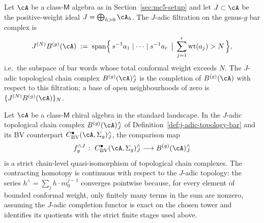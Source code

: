 \begin{definition}
\label{def:j-adic-topology-bar}
%
Let $\cA$ be a class-$\mathsf{M}$ algebra as in
Section~\textup{\ref{sec:mc5-setup}} and let $J \subset \cA$ be the
positive-weight ideal $J = \bigoplus_{h > 0} \cA_h$. The $J$-adic
filtration on the genus-$g$ bar complex is
\[
J^{(N)} B^{(g)}(\cA)
\;:=\;
\mathrm{span}\Bigl\{\,
s^{-1} a_1 \mid \cdots \mid s^{-1} a_r
\,\bigm|\,
\sum_{j=1}^r \operatorname{wt}(a_j) > N \,\Bigr\},
\]
i.e.\ the subspace of bar words whose total conformal weight exceeds $N$.
The $J$-adic topological chain complex $B^{(g)}(\cA)^{\wedge}_J$ is the
completion of $B^{(g)}(\cA)$ with respect to this filtration; a base of
open neighbourhoods of zero is $\{J^{(N)} B^{(g)}(\cA)\}_N$.
\end{definition}

\begin{theorem}
\label{thm:mc5-class-m-topological-chain-level-j-adic}
\ClaimStatusProvedHere
{}
Let $\cA$ be a class-$\mathsf{M}$ chiral algebra in the standard
landscape. In the $J$-adic topological chain complex
$B^{(g)}(\cA)^{\wedge}_J$ of
Definition~\textup{\ref{def:j-adic-topology-bar}} and its BV
counterpart $C^{\bullet}_{\mathrm{BV}}(\cA, \Sigma_g)^{\wedge}_J$, the
comparison map
\[
f_g^{\wedge J}
\;\colon\;
C^{\bullet}_{\mathrm{BV}}(\cA, \Sigma_g)^{\wedge}_J
\longrightarrow
B^{(g)}(\cA)^{\wedge}_J
\]
is a strict chain-level quasi-isomorphism of topological chain complexes.
The contracting homotopy is continuous with respect to the $J$-adic
topology: the series $h^{\wedge} = \sum_j h \cdot m_0^{j-1}$ converges
pointwise because, for every element of bounded conformal weight, only
finitely many terms in the sum are nonzero, assuming the $J$-adic
completion functor is exact on the chosen tower and identifies its
quotients with the strict finite stages used above.
\end{theorem}

